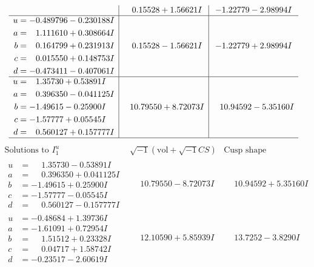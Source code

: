 \documentclass[1p]{elsarticle_modified}
\theoremstyle{definition}
\newcommand{\I}{\sqrt{-1}}
\begin{document}
$$\begin{array}{c|c|c}
 & \phantom{-}0.15528 + 1.56621 I & -1.22779 - 2.98994 I \\ \hline\begin{aligned}
u &= -0.489796 - 0.230188 I \\
a &= \phantom{-}1.111610 + 0.308664 I \\
b &= \phantom{-}0.164799 + 0.231913 I \\
c &= \phantom{-}0.015550 + 0.148753 I \\
d &= -0.473411 - 0.407061 I\end{aligned}
 & \phantom{-}0.15528 - 1.56621 I & -1.22779 + 2.98994 I \\ \hline\begin{aligned}
u &= \phantom{-}1.35730 + 0.53891 I \\
a &= \phantom{-}0.396350 - 0.041125 I \\
b &= -1.49615 - 0.25900 I \\
c &= -1.57777 + 0.05545 I \\
d &= \phantom{-}0.560127 + 0.157777 I\end{aligned}
 & \phantom{-}10.79550 + 8.72073 I & \phantom{-}10.94592 - 5.35160 I\\
 \hline 
 \end{array}$$\newpage$$\begin{array}{c|c|c}  
\text{Solutions to }I^u_{1}& \I (\text{vol} + \sqrt{-1}CS) & \text{Cusp shape}\\
 \hline 
\begin{aligned}
u &= \phantom{-}1.35730 - 0.53891 I \\
a &= \phantom{-}0.396350 + 0.041125 I \\
b &= -1.49615 + 0.25900 I \\
c &= -1.57777 - 0.05545 I \\
d &= \phantom{-}0.560127 - 0.157777 I\end{aligned}
 & \phantom{-}10.79550 - 8.72073 I & \phantom{-}10.94592 + 5.35160 I \\ \hline\begin{aligned}
u &= -0.48684 + 1.39736 I \\
a &= -1.61091 + 0.72954 I \\
b &= \phantom{-}1.51512 + 0.23328 I \\
c &= \phantom{-}0.04717 + 1.58742 I \\
d &= -0.23517 - 2.60619 I\end{aligned}
 & \phantom{-}12.10590 + 5.85939 I & \phantom{-}13.7252 - 3.8290 I \\ \hline\begin{aligned}

\end{aligned}
\end{array}$$
\end{document}
